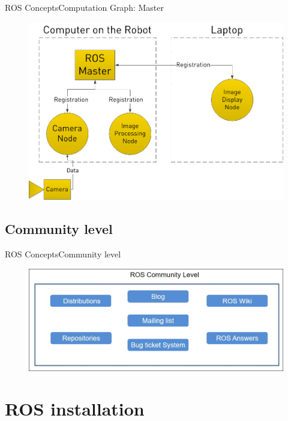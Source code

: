 \documentclass{beamer}
\begin{document}
\begin{frame}{ROS Concepts}{Computation Graph: Master}
\begin{figure}
\centering
\includegraphics[scale=0.3]{figs/nodeseg}
\end{figure}
\end{frame}


\subsection{Community level}

\begin{frame}{ROS Concepts}{Community level}
\begin{figure}
\centering
\includegraphics[scale=0.5]{figs/community}
\end{figure}
  
\end{frame}


\section{ROS installation}
\end{document}
